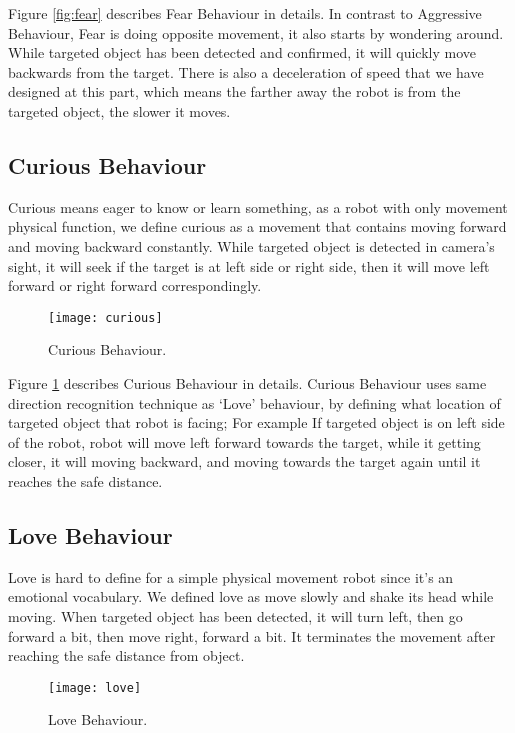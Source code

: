 Figure \ref{fig:fear} describes Fear Behaviour in details.
In contrast to Aggressive Behaviour, Fear is doing opposite movement, it also starts by wondering around. While targeted object has been detected and confirmed, it will quickly move backwards from the target. There is also a deceleration of speed that we have designed at this part, which means the farther away the robot is from the targeted object, the slower it moves.

\subsection{Curious Behaviour}

Curious means eager to know or learn something, as a robot with only movement physical function, we define curious as a movement that contains moving forward and moving backward constantly. While targeted object is detected in camera’s sight, it will seek if the target is at left side or right side, then it will move left forward or right forward correspondingly.

\begin{figure}
\centering
\texttt{[image: curious]}
\caption{Curious Behaviour.}
\label{fig:curious}
\end{figure}

Figure \ref{fig:curious} describes Curious Behaviour in details.
Curious Behaviour uses same direction recognition technique as ‘Love’ behaviour, by defining what location of targeted object that robot is facing; For example If targeted object is on left side of the robot, robot will move left forward towards the target, while it getting closer, it will moving backward, and moving towards the target again until it reaches the safe distance.

\subsection{Love Behaviour}

Love is hard to define for a simple physical movement robot since it’s an emotional vocabulary. We defined love as move slowly and shake its head while moving. When targeted object has been detected, it will turn left, then go forward a bit, then move right, forward a bit. It terminates the movement after reaching the safe distance from object.

\begin{figure}
\centering
\texttt{[image: love]}
\caption{Love Behaviour.}
\label{fig:love}
\end{figure}

